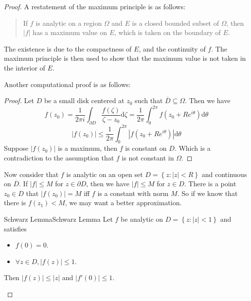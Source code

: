 \documentclass[../main.tex]{subfiles}
\begin{document}
\begin{proof}
A restatement of the maximum principle is as follows:
\begin{quote}
	If $f$ is analytic on a region $\Omega$ and $E$ is a closed bounded subset of $\Omega$, then $\left|f\right|$ has a maximum value on $E$, which is taken on the boundary of $E$.
\end{quote}
The existence is due to the compactness of $E$, and the continuity of $f$. The maximum principle is then used to show that the maximum value is not taken in the interior of $E$.

Another computational proof is as follows:
\begin{proof}
Let $D$ be a small disk centered at $z_0$ such that $\overline{D} \subseteq \Omega$. Then we have
\begin{equation*}
	f(z_0) = \frac{1}{2\pi i} \int_{\partial D} \frac{f(\zeta)}{\zeta-z_0} \mathrm{d} \zeta = \frac{1}{2\pi} \int_0^{2\pi} f(z_0 + Re^{i\theta}) \mathrm{d} \theta
\end{equation*}
\begin{equation*}
	\left|f(z_0)\right| \leq \frac{1}{2\pi} \int_0^{2\pi} \left|f(z_0 + Re^{i\theta})\right| \mathrm{d} \theta
\end{equation*}
Suppose $\left|f(z_0)\right|$ is a maximum, then $f$ is constant on $D$. Which is a contradiction to the assumption that $f$ is not constant in $\Omega$.
\end{proof}

Now consider that $f$ is analytic on an open set $D = \left\{ z: \left|z\right|<R \right\}$ and continuous on $\overline{D}$. If $\left|f\right|\leq M$ for $z\in \partial D$, then we have $\left|f\right|\leq M$ for $z\in D$. There is a point $z_0\in D$ that $\left|f(z_0)\right| = M$ iff $f$ is a constant with norm $M$. So if we know that there is $f(z_1)<M$, we may want a better approximation.

\begin{theorem}{Schwarz Lemma}{Schwarz Lemma}
	Let $f$ be analytic on $D=\left\{ z: \left|z\right|<1 \right\}$ and satisfies
	\begin{itemize}
	\item $f(0)=0$.
	\item $\forall z\in D, \left|f(z)\right| \leq 1$.
	\end{itemize}
	Then $\left|f(z)\right|\leq \left|z\right|$ and $\left|f'(0)\right|\leq 1$.


\end{theorem}
\end{proof}
\end{document}
